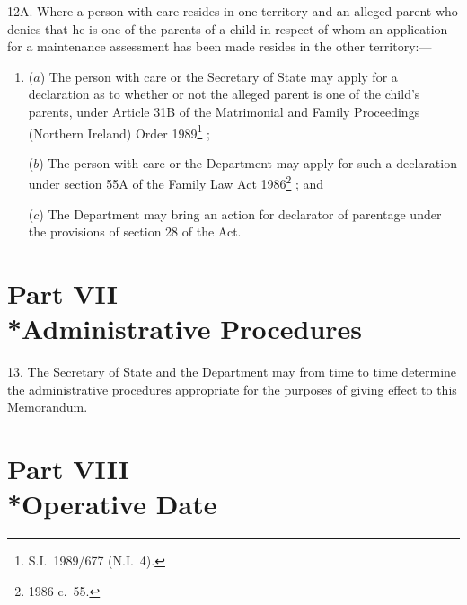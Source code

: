 \documentclass[12pt,a4paper]{article}
\begin{document}
12A.  Where a person with care resides in one territory and an alleged parent who denies that he is one of the parents of a child in respect of whom an application for a maintenance assessment has been made resides in the other territory:—
\begin{enumerate}\item[]
($a$) The person with care or the Secretary of State may apply for a declaration as to whether or not the alleged parent is one of the child’s parents, under
Article 31B of the Matrimonial and Family Proceedings (Northern Ireland) Order 1989\footnote{S.I.\ 1989/677 (N.I.\ 4).}%
;

($b$) The person with care or the Department 
may apply for such a declaration under 
section 55A of the Family Law Act 1986\footnote{1986 c.\ 55.}%
; and

($c$) The Department 
may bring an action for declarator of parentage under the provisions of section 28 of the Act.
\end{enumerate}


\section[Part VII --- Administrative Procedures]{Part VII\\*Administrative Procedures}

\renewcommand\parthead{--- Schedule 1 Part VII}

13.   The Secretary of State and the Department may from time to time determine the administrative procedures appropriate for the purposes of giving effect to this Memorandum.

\section[Part VIII --- Operative Date]{Part VIII\\*Operative Date}

\renewcommand\parthead{--- Schedule 1 Part VIII}
\end{document}
